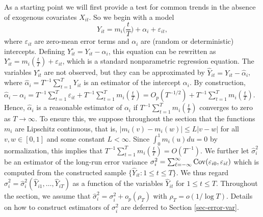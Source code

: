 As a starting point we will first provide a test for common trends in the absence of exogenous covariates $X_{it}$. So we begin with a model
\begin{equation}\label{model}
Y_{it} = m_i \Big( \frac{t}{T} \Big) + \alpha_i + \varepsilon_{it},
\end{equation} 
where $\varepsilon_{it}$ are zero-mean error terms and $\alpha_i$ are (random or deterministic) intercepts. Defining $Y_{it}^\circ = Y_{it} - \alpha_i$, this equation can be rewritten as $Y_{it}^\circ = m_i(\frac{t}{T}) + \varepsilon_{it}$, which is a standard nonparametric regression equation. The variables $Y_{it}^\circ$ are not observed, but they can be approximated by $\widehat{Y}_{it} = Y_{it} - \widehat{\alpha}_i$, where $\widehat{\alpha}_i = T^{-1} \sum_{t=1}^T Y_{it}$ is an estimator of the intercept $\alpha_i$. By construction, $\widehat{\alpha}_i - \alpha_i = T^{-1} \sum_{t=1}^T \varepsilon_{it} + T^{-1} \sum_{t=1}^T m_i(\frac{t}{T}) = O_p(T^{-1/2}) + T^{-1} \sum_{t=1}^T m_i(\frac{t}{T})$. Hence, $\widehat{\alpha}_i$ is a reasonable estimator of $\alpha_i$ if $T^{-1} \sum_{t=1}^T m_i(\frac{t}{T})$ converges to zero as $T \rightarrow \infty$. To ensure this, we suppose throughout the section that the functions $m_i$ are Lipschitz continuous, that is, $|m_i(v) - m_i(w)| \le L|v - w|$ for all $v,w \in [0,1]$ and some constant $L < \infty$. Since $\int_0^1 m_i(u) du = 0$ by normalization, this implies that $T^{-1} \sum_{t=1}^T m_i(\frac{t}{T}) = O(T^{-1})$. We further let $\widehat{\sigma}_i^2$ be an estimator of the long-run error variance $\sigma_i^2 = \sum\nolimits_{\ell=-\infty}^{\infty} \textnormal{Cov}(\varepsilon_{i0}, \varepsilon_{i\ell})$ which is computed from the constructed sample $\{ \widehat{Y}_{it}: 1 \le t \le T \}$. We thus regard $\widehat{\sigma}_i^2 = \widehat{\sigma}_i^2(\widehat{Y}_{i1},\ldots,\widehat{Y}_{iT})$ as a function of the variables $\widehat{Y}_{it}$ for $1 \le t \le T$. Throughout the section, we assume that $\widehat{\sigma}_i^2 = \sigma_i^2 + o_p(\rho_T)$ with $\rho_T = o(1/\log T)$. Details on how to construct estimators of $\sigma_i^2$ are deferred to Section \ref{sec-error-var}. 


